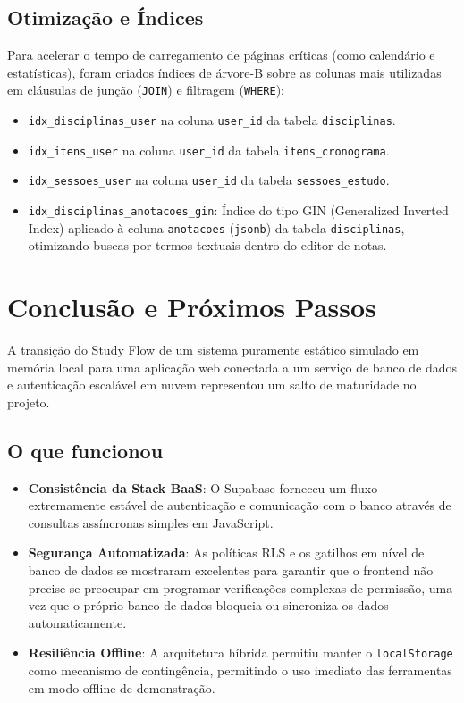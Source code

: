 \documentclass[12pt,a4paper]{article}
\begin{document}
\subsection{Otimização e Índices}
Para acelerar o tempo de carregamento de páginas críticas (como calendário e estatísticas), foram criados índices de árvore-B sobre as colunas mais utilizadas em cláusulas de junção (\texttt{JOIN}) e filtragem (\texttt{WHERE}):
\begin{itemize}
    \item \texttt{idx\_disciplinas\_user} na coluna \texttt{user\_id} da tabela \texttt{disciplinas}.
    \item \texttt{idx\_itens\_user} na coluna \texttt{user\_id} da tabela \texttt{itens\_cronograma}.
    \item \texttt{idx\_sessoes\_user} na coluna \texttt{user\_id} da tabela \texttt{sessoes\_estudo}.
    \item \texttt{idx\_disciplinas\_anotacoes\_gin}: Índice do tipo GIN (Generalized Inverted Index) aplicado à coluna \texttt{anotacoes} (\texttt{jsonb}) da tabela \texttt{disciplinas}, otimizando buscas por termos textuais dentro do editor de notas.
\end{itemize}

\section{Conclusão e Próximos Passos}
A transição do Study Flow de um sistema puramente estático simulado em memória local para uma aplicação web conectada a um serviço de banco de dados e autenticação escalável em nuvem representou um salto de maturidade no projeto.

\subsection{O que funcionou}
\begin{itemize}
    \item \textbf{Consistência da Stack BaaS}: O Supabase forneceu um fluxo extremamente estável de autenticação e comunicação com o banco através de consultas assíncronas simples em JavaScript.
    \item \textbf{Segurança Automatizada}: As políticas RLS e os gatilhos em nível de banco de dados se mostraram excelentes para garantir que o frontend não precise se preocupar em programar verificações complexas de permissão, uma vez que o próprio banco de dados bloqueia ou sincroniza os dados automaticamente.
    \item \textbf{Resiliência Offline}: A arquitetura híbrida permitiu manter o \texttt{localStorage} como mecanismo de contingência, permitindo o uso imediato das ferramentas em modo offline de demonstração.
\end{itemize}
\end{document}
